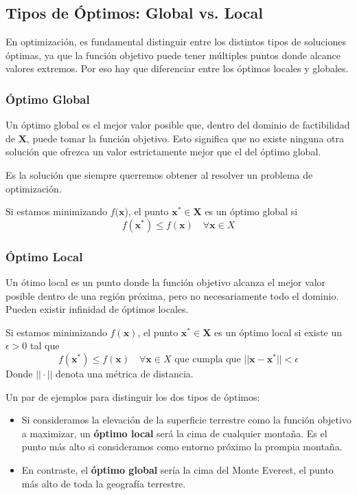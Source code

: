 \documentclass[12pt,a4paper]{book}
\begin{document}
\subsection{Tipos de Óptimos: Global vs. Local}

En optimización, es fundamental distinguir entre los distintos tipos de soluciones óptimas, ya que la función objetivo puede tener múltiples puntos donde alcance valores extremos. Por eso hay que diferenciar entre los óptimos locales y globales.

\subsubsection{Óptimo Global}
Un óptimo global es el mejor valor posible que, dentro del dominio de factibilidad de $\mathbf{X}$, puede tomar la función objetivo. Esto significa que no existe ninguna otra solución que ofrezca un valor estrictamente mejor que el del óptimo global.

Es la solución que siempre querremos obtener al resolver un problema de optimización.

Si estamos minimizando $f(\mathbf{x}$), el punto $\mathbf{x}^* \in \mathbf{X}$ es un óptimo global si
$$f(\mathbf{x}^*)\leq f(\mathbf{x}) \quad \forall \mathbf{x}\in X$$

\subsubsection{Óptimo Local}

Un ótimo local es un punto donde la función objetivo alcanza el mejor valor posible dentro de una región próxima, pero no necesariamente todo el dominio. Pueden existir infinidad de óptimos locales.

Si estamos minimizando $f(\mathbf{x})$, el punto $\mathbf{x}^* \in \mathbf{X}$ es un óptimo local si existe un $\epsilon>0$ tal que
$$f(\mathbf{x}^*)\leq f(\mathbf{x}) \quad \forall \mathbf{x}\in X \text{ que cumpla que }||\mathbf{x}-\mathbf{x}^*||<\epsilon$$
Donde $||\cdot||$ denota una métrica de distancia.

Un par de ejemplos para distinguir los dos tipos de óptimos:
\begin{itemize}
    \item Si consideramos la elevación de la superficie terrestre como la función objetivo a maximizar, un \textbf{óptimo local} será la cima de cualquier montaña. Es el punto más alto si consideramos como entorno próximo la prompia montaña.
    \item En contraste, el \textbf{óptimo global} sería la cima del Monte Everest, el punto más alto de toda la geografía terrestre.
\end{itemize}
\end{document}
